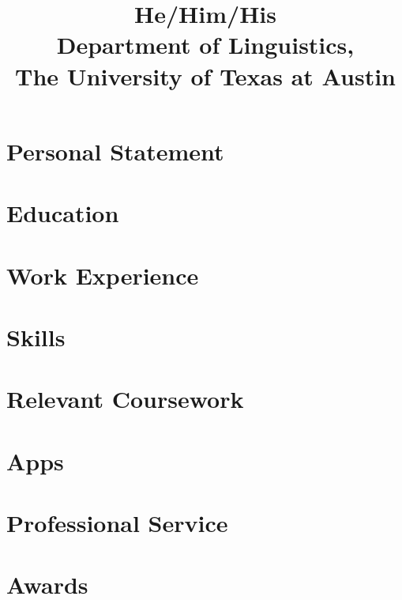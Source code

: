 \documentclass[a4paper]{practical-resume}
\title{He/Him/His\\Department of Linguistics,\\The University of Texas at Austin}
\begin{document}
\makecvtitle

\section{Personal Statement}


\section{Education}


\section{Work Experience}


\printbibliography[title=Select Publications]

\section{Skills}


\section{Relevant Coursework}


\section{Apps}


\section{Professional Service}


\section{Awards}

\end{document}
